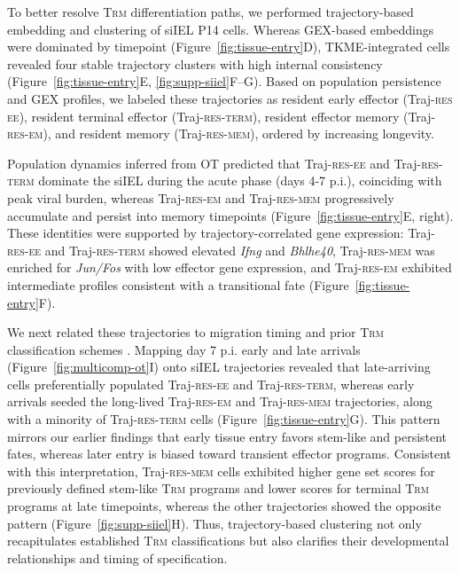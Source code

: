 To better resolve T\textsc{rm} differentiation paths, we performed trajectory-based embedding and clustering of siIEL P14 cells. Whereas GEX-based embeddings were dominated by timepoint (Figure~\ref{fig:tissue-entry}D), TKME-integrated cells revealed four stable trajectory clusters with high internal consistency (Figure~\ref{fig:tissue-entry}E, \ref{fig:supp-siiel}F--G). Based on population persistence and GEX profiles, we labeled these trajectories as resident early effector (Traj-\textsc{res ee}), resident terminal effector (Traj-\textsc{res-term}), resident effector memory (Traj-\textsc{res-em}), and resident memory (Traj-\textsc{res-mem}), ordered by increasing longevity.

Population dynamics inferred from OT predicted that Traj-\textsc{res-ee} and Traj-\textsc{res-term} dominate the siIEL during the acute phase (days 4-7 p.i.), coinciding with peak viral burden, whereas Traj-\textsc{res-em} and Traj-\textsc{res-mem} progressively accumulate and persist into memory timepoints (Figure~\ref{fig:tissue-entry}E, right). These identities were supported by trajectory-correlated gene expression: Traj-\textsc{res-ee} and Traj-\textsc{res-term} showed elevated \emph{Ifng} and \emph{Bhlhe40}, Traj-\textsc{res-mem} was enriched for \emph{Jun/Fos} with low effector gene expression, and Traj-\textsc{res-em} exhibited intermediate profiles consistent with a transitional fate (Figure~\ref{fig:tissue-entry}F).

We next related these trajectories to migration timing and prior T\textsc{rm} classification schemes \citep{kurdEarlyPrecursorsMolecular2020, reina-camposTissueresidentMemoryCD82025}. Mapping day 7 p.i. early and late arrivals (Figure~\ref{fig:multicomp-ot}I) onto siIEL trajectories revealed that late-arriving cells preferentially populated Traj-\textsc{res-ee} and Traj-\textsc{res-term}, whereas early arrivals seeded the long-lived Traj-\textsc{res-em} and Traj-\textsc{res-mem} trajectories, along with a minority of Traj-\textsc{res-term} cells (Figure~\ref{fig:tissue-entry}G). This pattern mirrors our earlier findings that early tissue entry favors stem-like and persistent fates, whereas later entry is biased toward transient effector programs. Consistent with this interpretation, Traj-\textsc{res-mem} cells exhibited higher gene set scores for previously defined stem-like T\textsc{rm} programs \citep{kurdEarlyPrecursorsMolecular2020, reina-camposTissueresidentMemoryCD82025} and lower scores for terminal T\textsc{rm} programs \citep{kurdEarlyPrecursorsMolecular2020, reina-camposTissueresidentMemoryCD82025} at late timepoints, whereas the other trajectories showed the opposite pattern (Figure~\ref{fig:supp-siiel}H). Thus, trajectory-based clustering not only recapitulates established T\textsc{rm} classifications but also clarifies their developmental relationships and timing of specification.

